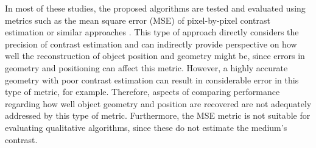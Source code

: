 \documentclass{IEEEtran}
\begin{document}


        In most of these studies, the proposed algorithms are tested and evaluated using metrics such as the mean square error (MSE) of pixel-by-pixel contrast estimation or similar approaches \cite{yin2023subspace,zhang2023iterative,salucci2022learned,wang2023push,liu2022som,bevacqua2021simple,bevacqua2021effective}. This type of approach directly considers the precision of contrast estimation and can indirectly provide perspective on how well the reconstruction of object position and geometry might be, since errors in geometry and positioning can affect this metric. However, a highly accurate geometry with poor contrast estimation can result in considerable error in this type of metric, for example. Therefore, aspects of comparing performance regarding how well object geometry and position are recovered are not adequately addressed by this type of metric. Furthermore, the MSE metric is not suitable for evaluating qualitative algorithms, since these do not estimate the medium's contrast.
\end{document}
